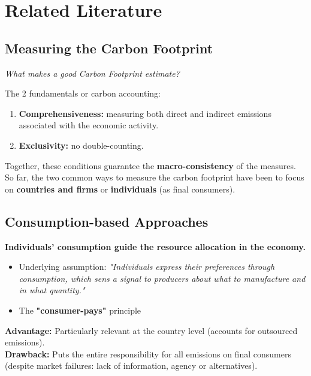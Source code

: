 \documentclass[10pt]{beamer}
\begin{document}
\section{Related Literature}
\begin{frame}
    \tableofcontents[currentsection, hideothersubsections, sections=\value{section}]
\end{frame}

\subsection{Measuring the Carbon Footprint}
\begin{frame}{\subsecname}

    \textit{What makes a good Carbon Footprint estimate?}
    
    The 2 fundamentals or carbon accounting:
        \begin{enumerate}
            \item \textbf{Comprehensiveness:} measuring both direct and indirect emissions associated with the economic activity.
            \item \textbf{Exclusivity:} no double-counting.
        \end{enumerate}
    
    Together, these conditions guarantee the \textbf{macro-consistency} of the measures. \\
    So far, the two common ways to measure the carbon footprint have been to focus on \textbf{countries and firms} or \textbf{individuals} (as final consumers).
\end{frame}

\subsection{Consumption-based Approaches}
\begin{frame}{\subsecname}
    \textbf{Individuals' consumption guide the resource allocation in the economy.}
        \begin{itemize}
            \item Underlying assumption: \textit{"Individuals express their preferences through consumption, which sens a signal to producers about what to manufacture and in what quantity."}
            \item The \textbf{"consumer-pays"} principle
        \end{itemize}
        \textbf{Advantage:} Particularly relevant at the country level (accounts for outsourced emissions). \\
        \textbf{Drawback:} Puts the entire responsibility for all emissions on final consumers (despite market failures: lack of information, agency or alternatives).
\end{frame}
\end{document}
